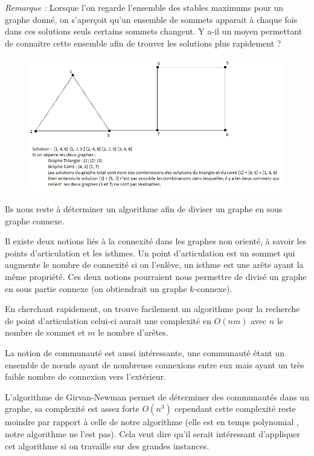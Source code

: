 \documentclass[10pt,a4paper]{article}
\begin{document}
\textit{Remarque :} Lorsque l'on regarde l'ensemble des stables maximums pour un graphe donné, on s'aperçoit qu'un ensemble de sommets apparait à chaque fois dans ces solutions seuls certains sommets changent. Y a-il un moyen permettant de connaitre cette ensemble afin de trouver les solutions plus rapidement ?

\begin{figure}[h]
 \hspace{-4cm}
\includegraphics[scale=1]{image1.png}
\end{figure} 

Ils nous reste à déterminer un algorithme afin de diviser un graphe en sous graphe connexe.

Il existe deux notions liés à la connexité dans les graphes non orienté, à savoir les points d'articulation et les isthmes. Un point d'articulation est un sommet qui augmente le nombre de connexité si on l'enlève, un isthme est une arête ayant la même propriété. Ces deux notions pourraient nous permettre de divisé un graphe en sous partie connexe (on obtiendrait un graphe $k$-connexe).

En cherchant rapidement, on trouve facilement un algorithme pour la recherche de point d'articulation celui-ci aurait une complexité en $O(nm)$ avec $n$ le nombre de sommet et $m$ le nombre d'arêtes. 

La notion de communauté est aussi intéressante, une communauté étant un ensemble de nœuds ayant de nombreuse connexions entre eux mais ayant un très faible nombre de connexion vers l'extérieur.

L'algorithme de Girvan-Newman permet de déterminer des communautés dans un graphe, sa complexité est assez forte $O(n^3)$ cependant cette complexité reste moindre par rapport à celle de notre algorithme (elle est en temps polynomial , notre algorithme ne l'est pas). Cela veut dire qu'il serait intéressant d'appliquer cet algorithme si on travaille sur des grandes instances.
\end{document}
